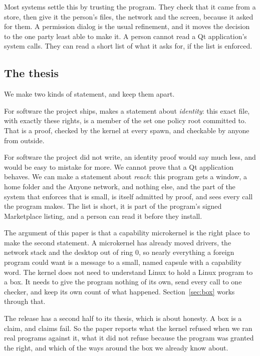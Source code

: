 Most systems settle this by trusting the program. They check that it came from a store, then give it the person's files, the network and the screen, because it asked for them. A permission dialog is the usual refinement, and it moves the decision to the one party least able to make it. A person cannot read a Qt application's system calls. They can read a short list of what it asks for, if the list is enforced.

\subsection{The thesis}

We make two kinds of statement, and keep them apart.

For software the project ships, \nonos{} makes a statement about \emph{identity}: this exact file, with exactly these rights, is a member of the set one policy root committed to. That is a proof, checked by the kernel at every spawn, and checkable by anyone from outside.

For software the project did not write, an identity proof would say much less, and would be easy to mistake for more. We cannot prove that a Qt application behaves. We can make a statement about \emph{reach}: this program gets a window, a home folder and the Anyone network, and nothing else, and the part of the system that enforces that is small, is itself admitted by proof, and sees every call the program makes. The list is short, it is part of the program's signed Marketplace listing, and a person can read it before they install.

The argument of this paper is that a capability microkernel is the right place to make the second statement. A microkernel has already moved drivers, the network stack and the desktop out of ring 0, so nearly everything a foreign program could want is a message to a small, named capsule with a capability word. The kernel does not need to understand Linux to hold a Linux program to a box. It needs to give the program nothing of its own, send every call to one checker, and keep its own count of what happened. Section~\ref{sec:box} works through that.

The release has a second half to its thesis, which is about honesty. A box is a claim, and claims fail. So the paper reports what the kernel refused when we ran real programs against it, what it did not refuse because the program was granted the right, and which of the ways around the box we already know about.

